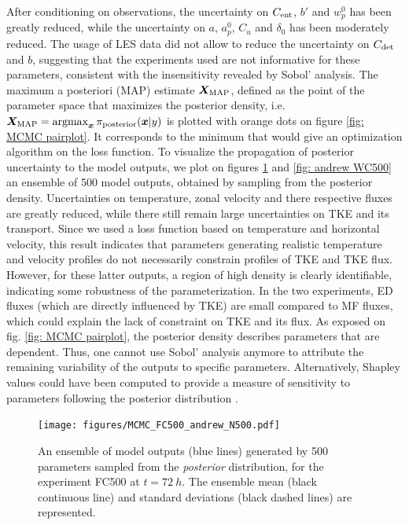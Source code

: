 \documentclass[draft]{agujournal2019}
\begin{document}
%
\par After conditioning on observations, the uncertainty on $C_{\rm ent}$, $b'$ and $w_p^0$ has been greatly reduced, while the uncertainty on $a$, $a_p^0$, $C_u$ and $\delta_0$ has been moderately reduced. The usage of LES data did not allow to reduce the uncertainty on $C_{\rm det}$ and $b$, suggesting that the experiments used are not informative for these parameters, consistent with the insensitivity revealed by Sobol' analysis. 
%
The maximum a posteriori (MAP) estimate $\bm X_{\rm MAP}$, defined as the point of the parameter space that maximizes the posterior density, i.e. $\bm X_{\rm MAP} = \operatorname{argmax}_{\bm x} \pi_{\text{posterior}}(\bm x | y)$ is plotted with orange dots on figure \ref{fig: MCMC pairplot}. It corresponds to the minimum that would give an optimization algorithm on the loss function. 
To visualize the propagation of posterior uncertainty to the model outputs, we plot on figures \ref{fig: andrew FC500} and \ref{fig: andrew WC500} an ensemble of 500 model outputs, obtained by sampling from the posterior density. Uncertainties on temperature, zonal velocity and there respective fluxes are greatly reduced, while there still remain large uncertainties on TKE and its transport. Since we used a loss function based on temperature and horizontal velocity, this result indicates that parameters generating realistic temperature and velocity profiles do not necessarily constrain profiles of TKE and TKE flux. However, for these latter outputs, a region of high density is clearly identifiable, indicating some robustness of the parameterization. In the two experiments, ED fluxes (which are directly influenced by TKE) are small compared to MF fluxes, which could explain the lack of constraint on TKE and its flux. 
%
As exposed on fig. \ref{fig: MCMC pairplot}, the posterior density describes parameters that are dependent. Thus, one cannot use Sobol' analysis anymore to attribute the remaining variability of the outputs to specific parameters. Alternatively, Shapley values could have been computed to provide a measure of sensitivity to parameters following the posterior distribution \cite{owen_shapley_2017}.
%
%
\begin{figure}
    \texttt{[image: figures/MCMC\_FC500\_andrew\_N500.pdf]}
    \caption{An ensemble of model outputs (blue lines) generated by 500 parameters sampled from the \textit{posterior} distribution, for the experiment FC500 at $t=\SI{72}{h}$. The ensemble mean (black continuous line) and standard deviations (black dashed lines) are represented.  }
    \label{fig: andrew FC500}
\end{figure}
\end{document}

